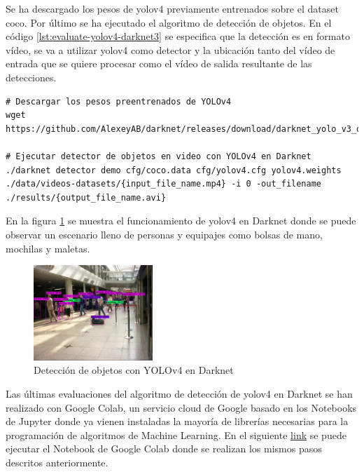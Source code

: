 Se ha descargado los pesos de \gls{yolov4} previamente entrenados sobre el dataset \gls{coco}. Por último se ha ejecutado el algoritmo de detección de objetos. En el código \ref{lst:evaluate-yolov4-darknet3} se especifica que la detección es en formato vídeo, se va a utilizar \gls{yolov4} como detector y la ubicación tanto del vídeo de entrada que se quiere procesar como el vídeo de salida resultante de las detecciones.

\vspace{0.5cm}
\begin{lstlisting}[language=iPython,caption=Evaluación del detector de objetos YOLOv4 en Darknet (3),captionpos=b,label={lst:evaluate-yolov4-darknet3}]
# Descargar los pesos preentrenados de YOLOv4
wget https://github.com/AlexeyAB/darknet/releases/download/darknet_yolo_v3_optimal/yolov4.weights

# Ejecutar detector de objetos en video con YOLOv4 en Darknet
./darknet detector demo cfg/coco.data cfg/yolov4.cfg yolov4.weights ./data/videos-datasets/{input_file_name.mp4} -i 0 -out_filename ./results/{output_file_name.avi}
\end{lstlisting}

En la figura \ref{fig:detection-yolov4-darknet-pets2007} se muestra el funcionamiento de \gls{yolov4} en Darknet donde se puede observar un escenario lleno de personas y equipajes como bolsas de mano, mochilas y maletas.

\begin{figure}[ht]
\centering
\includegraphics[width=0.4\textwidth]{img/chapters/desarrollo/S08-fourthView-detection.jpg}
\caption{\label{fig:detection-yolov4-darknet-pets2007}Detección de objetos con YOLOv4 en Darknet}
\end{figure}

Las últimas evaluaciones del algoritmo de detección de \gls{yolov4} en Darknet se han realizado con Google Colab, un servicio cloud de Google basado en los Notebooks de Jupyter donde ya vienen instaladas la mayoría de librerías necesarias para la programación de algoritmos de Machine Learning. En el siguiente \href{https://colab.research.google.com/drive/1kXcZL7iZ2sZmyFuQ6GwVFfkfyha6A6nr?usp=sharing}{link} se puede ejecutar el Notebook de Google Colab donde se realizan los mismos pasos descritos anteriormente.

